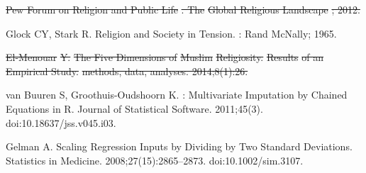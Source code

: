 \documentclass[10pt,letterpaper]{article}
\providecommand{\DIFdeltex}[1]{{\protect\color{red}\sout{#1}}}                      %
\providecommand{\DIFdelbegin}{} %
\providecommand{\DIFdelend}{} %
\providecommand{\DIFdel}[1]{\texorpdfstring{\DIFdeltex{#1}}{}} %
\newcommand{\DIFscaledelfig}{0.5}
\newlength{\DIFdelgraphicswidth} %
\newlength{\DIFdelgraphicsheight} %
\newcommand{\DIFdelincludegraphics}[2][]{%
\sbox{\DIFdelgraphicsbox}{\DIFOincludegraphics[#1]{#2}}%
\settoboxwidth{\DIFdelgraphicswidth}{\DIFdelgraphicsbox} %
\settoboxtotalheight{\DIFdelgraphicsheight}{\DIFdelgraphicsbox} %
\scalebox{\DIFscaledelfig}{%
\parbox[b]{\DIFdelgraphicswidth}{\usebox{\DIFdelgraphicsbox}\\[-\baselineskip] \rule{\DIFdelgraphicswidth}{0em}}\llap{\resizebox{\DIFdelgraphicswidth}{\DIFdelgraphicsheight}{%
\setlength{\unitlength}{\DIFdelgraphicswidth}%
\begin{picture}(1,1)%
\thicklines\linethickness{2pt} %
{\color[rgb]{1,0,0}\put(0,0){\framebox(1,1){}}}%
{\color[rgb]{1,0,0}\put(0,0){\line( 1,1){1}}}%
{\color[rgb]{1,0,0}\put(0,1){\line(1,-1){1}}}%
\end{picture}%
}\hspace*{3pt}}} %
} %
\DeclareRobustCommand{\DIFdelbegin}{\DIFOdelbegin \let\includegraphics\DIFdelincludegraphics} %
\DeclareRobustCommand{\DIFdelend}{\DIFOaddend \let\includegraphics\DIFOincludegraphics} %
\begin{document}
\begin{thebibliography}{10}
\DIFdelbegin {}
\DIFdel{Pew Forum on Religion and Public Life}%
\DIFdel{. The }%
\DIFdel{Global Religious Landscape}%
\DIFdel{;
  2012.
}%

\DIFdelend {}
Glock CY, Stark R.
\newblock Religion and {{Society}} in {{Tension}}.
: {Rand McNally}; 1965.

\DIFdelbegin {}
\DIFdel{El-Menouar}%
\DIFdel{Y.
}%
\DIFdel{The Five Dimensions of }%
\DIFdel{Muslim}%
\DIFdel{Religiosity. }%
\DIFdel{Results}%
\DIFdel{of an
  Empirical Study.
}%
\DIFdel{methods, data, analyses. 2014;8(1):26.
}%

\DIFdelend {}
van Buuren S, {Groothuis-Oudshoorn} K.
 : {{Multivariate Imputation}} by {{Chained Equations}} in
  {{R}}.
\newblock Journal of Statistical Software. 2011;45(3).
\newblock doi:{10.18637/jss.v045.i03}.

Gelman A.
\newblock Scaling {{Regression Inputs}} by {{Dividing}} by {{Two Standard
  Deviations}}.
\newblock Statistics in Medicine. 2008;27(15):2865--2873.
\newblock doi:{10.1002/sim.3107}.

\end{thebibliography}
\DIFdelbegin %

\DIFdelend 
\end{document}
